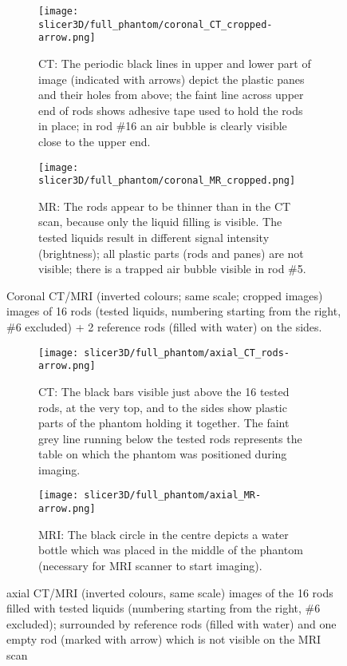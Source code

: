 \begin{figure}[!tbp]
  \begin{subfigure}[b]{\textwidth}
    \texttt{[image: slicer3D/full\_phantom/coronal\_CT\_cropped-arrow.png]}
    \caption{CT: The periodic black lines in upper and lower part of image (indicated with arrows) depict the plastic panes and their holes from above; the faint line across upper end of rods shows adhesive tape used to hold the rods in place; in rod \#16 an air bubble is clearly visible close to the upper end.}
    \label{fig:coronal_CT}
  \end{subfigure}
  \begin{subfigure}[b]{1\textwidth}
    \texttt{[image: slicer3D/full\_phantom/coronal\_MR\_cropped.png]}
    \caption{MR: The rods appear to be thinner than in the CT scan, because only the liquid filling is visible. The tested liquids result in different signal intensity (brightness); all plastic parts (rods and panes) are not visible; there is a trapped air bubble visible in rod \#5.}
    \label{fig:coronal_MR}
  \end{subfigure}
  \caption{Coronal CT/MRI (inverted colours; same scale; cropped images) images of 16 rods (tested liquids, numbering starting from the right, \#6 excluded) + 2 reference rods (filled with water) on the sides.}
  \label{fig:coronal}
\end{figure}

\begin{figure}[!tbp]
  \begin{subfigure}[b]{\textwidth}
    \texttt{[image: slicer3D/full\_phantom/axial\_CT\_rods-arrow.png]}
    \caption{CT: The black bars visible just above the 16 tested rods, at the very top, and to the sides show plastic parts of the phantom holding it together. The faint grey line running below the tested rods represents the table on which the phantom was positioned during imaging.}
    \label{fig:axial_CT_rods}
  \end{subfigure}
  \begin{subfigure}[b]{\textwidth}
    \texttt{[image: slicer3D/full\_phantom/axial\_MR-arrow.png]}
    \caption{MRI: The black circle in the centre depicts a water bottle which was placed in the middle of the phantom (necessary for MRI scanner to start imaging).}
    \label{fig:axial_MR}
  \end{subfigure}
  \caption{axial CT/MRI (inverted colours, same scale) images of the 16 rods filled with tested liquids (numbering starting from the right, \#6 excluded); surrounded by reference rods (filled with water) and one empty rod (marked with arrow) which is not visible on the MRI scan}
  \label{fig:axial}
\end{figure}


